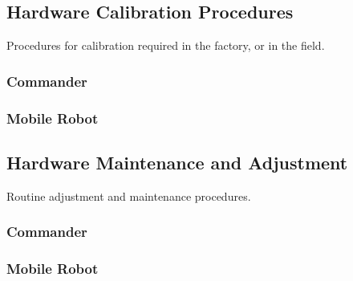 \documentclass[11pt,a4paper]{article}
\begin{document}
  \subsection{Hardware Calibration Procedures}
    Procedures for calibration required in the factory, or in the field.
    \subsubsection{Commander}
    \subsubsection{Mobile Robot}

  \subsection{Hardware Maintenance and Adjustment}
    Routine adjustment and maintenance procedures.
    \subsubsection{Commander}
    \subsubsection{Mobile Robot}
\end{document}
